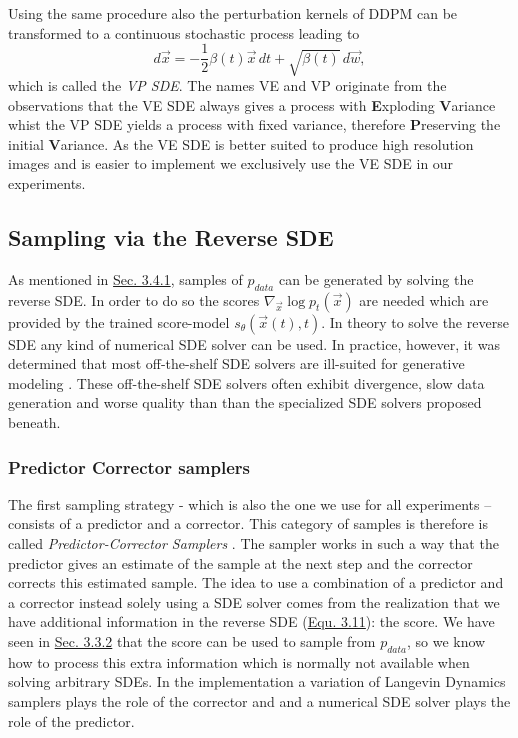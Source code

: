 Using the same procedure also the perturbation kernels of DDPM can be transformed to a continuous stochastic process leading to
%
\begin{equation} \label{equ:3.19}
    d\vec{x}=-\frac{1}{2}\beta(t)\vec{x}\,dt+\sqrt{\beta(t)}\,d\vec{w},
\end{equation}
%
which is called the \textit{VP SDE}. The names VE and VP originate from the observations that the VE SDE always gives a process with \textbf{E}xploding \textbf{V}ariance whist the VP SDE yields a process with fixed variance, therefore \textbf{P}reserving the initial \textbf{V}ariance. As the VE SDE is better suited to produce high resolution images and is easier to implement we exclusively use the VE SDE in our experiments.

\subsection{Sampling via the Reverse SDE}
As mentioned in \hyperref[sec:3.4.1]{Sec. 3.4.1}, samples of $p_{data}$ can be generated by solving the reverse SDE. In order to do so the scores $\nabla_{\vec{x}}\log p_t(\vec{x})$ are needed which are provided by the trained score-model $s_\theta(\vec{x}(t),t)$. In theory to solve the reverse SDE any kind of numerical SDE solver can be used. In practice, however, it was determined that most off-the-shelf SDE solvers are ill-suited for generative modeling \cite{gotta_go_fast}. These off-the-shelf SDE solvers often exhibit divergence, slow data generation and worse quality than than the specialized SDE solvers proposed beneath.

\subsubsection{Predictor Corrector samplers}
The first sampling strategy - which is also the one we use for all experiments – consists of a predictor and a corrector. This category of samples is therefore is called \textit{Predictor-Corrector Samplers} \cite{score_3}. The sampler works in such a way that the predictor gives an estimate of the sample at the next step and the corrector corrects this estimated sample. The idea to use a combination of a predictor and a corrector instead solely using a SDE solver comes from the realization that we have additional information in the reverse SDE (\hyperref[equ:3.11]{Equ. 3.11}): the score. We have seen in \hyperref[sec:3.3.2]{Sec. 3.3.2} that the score can be used to sample from $p_{data}$, so we know how to process this extra information which is normally not available when solving arbitrary SDEs. In the implementation a variation of Langevin Dynamics samplers plays the role of the corrector and and a numerical SDE solver plays the role of the predictor.

